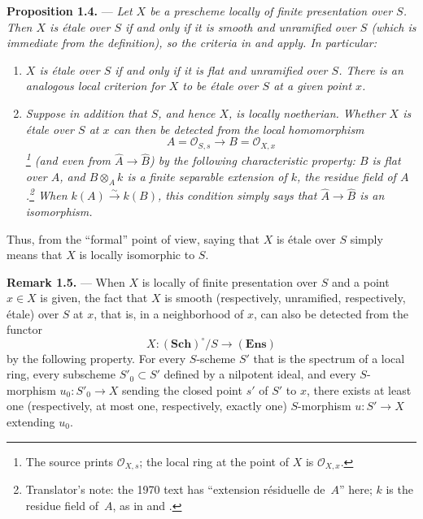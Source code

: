 \medskip
\noindent{}\textbf{Proposition 1.4.} ---
\textit{Let \(X\) be a prescheme locally of finite presentation over
\(S\).  Then \(X\) is étale over \(S\) if and only if it is smooth and
unramified over \(S\) (which is immediate from the definition), so the
criteria in  and  apply.  In particular:}

\begin{enumerate}
\item[(i)]  \textit{\(X\) is étale over \(S\) if and only if it is flat
and unramified over \(S\).  There is an analogous local criterion for
\(X\) to be étale over \(S\) at a given point \(x\).}

\item[(ii)]  \textit{Suppose in addition that \(S\), and hence \(X\),
is locally noetherian.  Whether \(X\) is étale over \(S\) at \(x\) can
then be detected from the local homomorphism
\[
  A=\mathscr O_{S,s}\longrightarrow B=\mathscr O_{X,x}
\]
\footnote{The source prints \(\mathscr O_{X,s}\); the local ring at the
point of \(X\) is \(\mathscr O_{X,x}\).}
(and even from \(\widehat A\to\widehat B\)) by the following
characteristic property: \(B\) is flat over \(A\), and \(B\otimes_A k\)
is a finite separable extension of \(k\), the residue
field of \(A\).\footnote{Translator's note: the 1970 text has ``extension résiduelle de~\(A\)''
here; \(k\) is the residue field of~\(A\), as in
 and
.}  When
\(k(A)\xrightarrow{\sim}k(B)\), this condition simply says that
\(\widehat A\to\widehat B\) is an isomorphism.}
\end{enumerate}

Thus, from the ``formal'' point of view, saying that \(X\) is étale
over \(S\) simply means that \(X\) is locally isomorphic to \(S\).

\medskip
\noindent{}\textbf{Remark 1.5.} ---
When \(X\) is locally of finite presentation over \(S\) and a point
\(x\in X\) is given, the fact that \(X\) is smooth (respectively,
unramified, respectively, étale) over \(S\) at \(x\), that is, in a
neighborhood of \(x\), can also be detected from the functor
\[
  X:(\mathbf{Sch})^\circ/S\longrightarrow(\mathbf{Ens})
\]
by the following property.  For every \(S\)-scheme \(S'\) that is the
spectrum of a local ring, every subscheme \(S'_0\subset S'\) defined
by a nilpotent ideal, and every \(S\)-morphism
\(u_0:S'_0\to X\) sending the closed point \(s'\) of \(S'\) to \(x\),
there exists at least one (respectively, at most one, respectively,
exactly one) \(S\)-morphism \(u:S'\to X\) extending \(u_0\).

